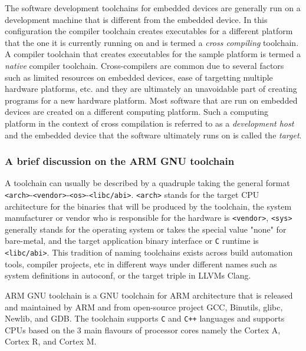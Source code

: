 The software development toolchains for embedded devices are generally run on a development machine that is different from the embedded device. In this configuration the compiler toolchain creates executables for a different platform that the one it is currently running on and is termed a \textit{cross compiling} toolchain. A compiler toolchain that creates executables for the sample platform is termed a \textit{native} compiler toolchain. Cross-compilers are common due to several factors such as limited resources on embedded devices, ease of targetting multiple hardware platforms, etc. and they are ultimately an unavoidable part of creating programs for a new hardware platform. Most software that are run on embedded devices are created on a different computing platform. Such a computing platform in the context of cross compilation is referred to as a \textit{development host} and the embedded device that the software ultimately runs on is called the \textit{target}.

\subsubsection{A brief discussion on the ARM GNU toolchain}


A toolchain can usually be described by a quadruple taking the general format \texttt{<arch>}-\texttt{<vendor>}-\texttt{<os>}-\texttt{<libc/abi>}. \texttt{<arch>} stands for the target CPU architecture for the binaries that will be produced by the toolchain, the system manufacturer or vendor who is responsible for the hardware is \texttt{<vendor>}, \texttt{<sys>} generally stands for the operating system or takes the special value "none" for bare-metal, and the target application binary interface or \texttt{C} runtime is \texttt{<libc/abi>}. This tradition of naming toolchains exists across build automation tools, compiler projects, etc in different ways under different names such as system definitions in autoconf, or the target triple in LLVM\textquotesingle s Clang.

ARM GNU toolchain is a GNU toolchain for ARM architecture that is released and maintained by ARM and from open-source project GCC, Binutils, glibc, Newlib, and GDB. The toolchain supports \texttt{C} and \texttt{C++} languages and supports CPUs based on the 3 main flavours of processor cores namely the Cortex A, Cortex R, and Cortex M.

